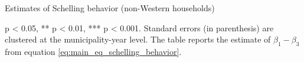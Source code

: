 \documentclass[../main.tex]{subfiles}
\begin{document}
\begin{table}[H]
    \caption{Estimates of Schelling behavior (non-Western households)}
    \label{tab:main_results_non_west}
    \begin{threeparttable}
            
    \begin{tablenotes}[flushleft]
    \item \scriptsize * p < 0.05, ** p < 0.01, *** p < 0.001. Standard errors (in parenthesis) are clustered at the municipality-year level. The table reports the estimate of $\beta_1 - \beta_3$ from equation \ref{eq:main_eq_schelling_behavior}. 
    \end{tablenotes}
    \end{threeparttable}
\end{table}
\end{document}
